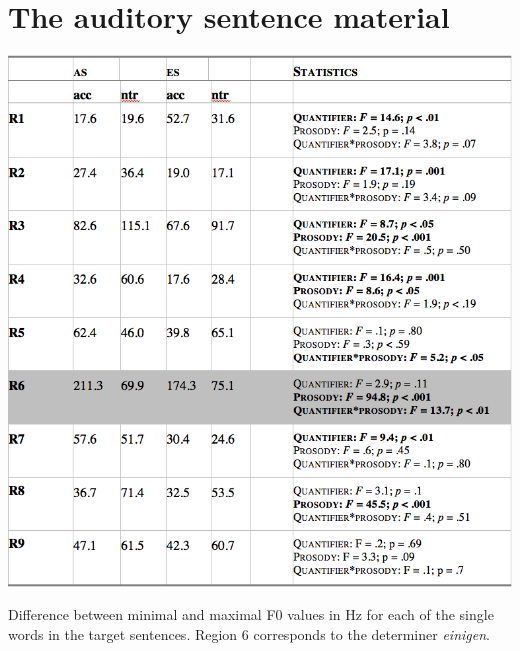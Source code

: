 \documentclass[fleqn,reqno,10pt,draft]{article}
\begin{document}
\newpage

\appendix

\section{The auditory sentence material}
\label{sec:audit-sent-mater}


\begin{table}[!hp]
  \centering
  
  \includegraphics[width=\textwidth]{../pictures/Acoustics/Table-B.png}

  \caption{Difference between minimal and maximal F0 values in Hz for
    each of the single words in the target sentences. Region 6
    corresponds to the determiner \emph{einigen}.} 
  \label{tab:table-B}
\end{table}
\end{document}
